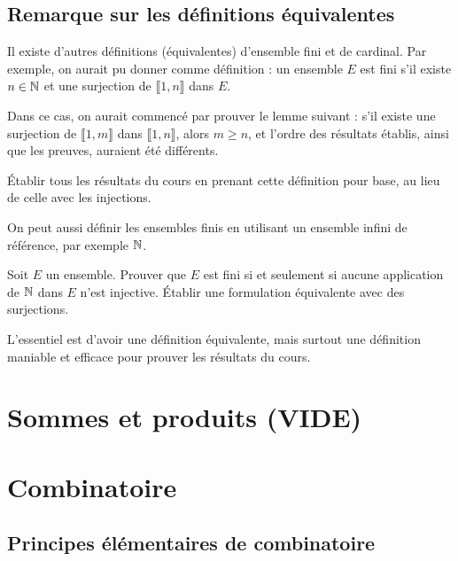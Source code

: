 \subsection{Remarque sur les définitions équivalentes}

Il existe d'autres définitions (équivalentes) d'ensemble fini et de cardinal.
Par exemple, on aurait pu donner comme définition  : un ensemble $E$ est fini s'il existe $n\in \mathbb{N}$ et une surjection de $\llbracket 1,n\rrbracket$ dans $E$.

Dans ce cas, on aurait commencé par prouver le lemme suivant : \og s'il existe une surjection de $\llbracket 1,m\rrbracket$ dans $\llbracket 1,n\rrbracket$, alors $m\geq n$\fg, et l'ordre des résultats établis, ainsi que les preuves, auraient été différents.

\begin{exercice} \'Etablir tous les résultats du cours en prenant  cette définition pour base, au lieu de celle avec les injections.
\end{exercice}

On peut aussi définir les ensembles finis en utilisant un ensemble \og infini\fg{} de référence, par exemple $\mathbb{N}$.

\begin{exercice}
Soit $E$ un ensemble.
Prouver que $E$ est fini si et seulement si aucune application de $\mathbb{N}$ dans $E$ n'est injective.
\'Etablir une formulation équivalente avec des surjections.
\end{exercice}

L'essentiel est d'avoir une définition équivalente, mais surtout une définition maniable et efficace pour prouver les résultats du cours.

\section{Sommes et produits (VIDE)}



\section{Combinatoire}
\subsection{Principes élémentaires de combinatoire}

